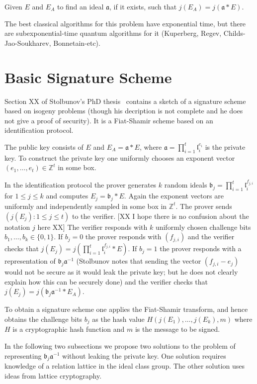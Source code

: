 \documentclass{llncs}
\newcommand{\Z}{\mathbb{Z}}
\renewcommand{\a}{\mathfrak{a}}
\renewcommand{\b}{\mathfrak{b}}
\renewcommand{\l}{\mathfrak{l}}
\begin{document}
\begin{definition}\label{defn:ass1}
Given $E$ and $E_A$ to find an ideal $\a$, if it exists, such that $j( E_A ) = j( \a * E )$.
\end{definition}

The best classical algorithms for this problem have exponential time, but there are subexponential-time quantum algorithms for it (Kuperberg, Regev, Childs-Jao-Soukharev, Bonnetain-etc).


\section{Basic Signature Scheme}

Section XX of Stolbunov's PhD thesis~\cite{Sto12} contains a sketch of a signature scheme based on isogeny problems (though his decription is not complete and he does not give a proof of security).
It is a Fiat-Shamir scheme based on an identification protocol.

The public key consists of $E$ and $E_A = \a * E$, where $\a = \prod_{i=1}^t \l_i^{e_i}$ is the private key.
To construct the private key one uniformly chooses an exponent vector $(e_1, \dots, e_t) \in \Z^t$ in some box.

In the identification protocol the prover generates $k$ random ideals $\b_j = \prod_{i=1}^t \l_i^{f_{j,i}}$ for $1 \le j \le k$ and computes $E_j = \b_j * E$.
Again the exponent vectors are uniformly and independently sampled in some box in $\Z^t$.
The prover sends $(j( E_j ) : 1 \le j \le t )$ to the verifier.
[XX I hope there is no confusion about the notation $j$ here XX]
The verifier responds with $k$ uniformly chosen challenge bits $b_1, \dots, b_k \in \{0,1\}$.
If $b_j = 0$ the prover responds with $( f_{j,i} )$ and the verifier checks that $j(E_j) = j( \prod_{i=1}^t \l_i^{f_{j,i}} * E )$.
If $b_j = 1$ the prover responds with a representation of $\b_j \a^{-1}$ (Stolbunov notes that sending the vector $(f_{j,i} - e_j )$ would not be secure as it would leak the private key; but he does not clearly explain how this can be securely done) and the verifier checks that $j(E_j) = j( \b_j \a^{-1} * E_A )$.

To obtain a signature scheme one applies the Fiat-Shamir transform, and hence obtains the challenge bits $b_j$ as the hash value $H( j(E_1), \dots, j(E_k) , m )$ where $H$ is a cryptographic hash function and $m$ is the message to be signed.

In the following two subsections we propose two solutions to the problem of representing $\b_j \a^{-1}$ without leaking the private key. One solution requires knowledge of a relation lattice in the ideal class group. The other solution uses ideas from lattice cryptography.
\end{document}
